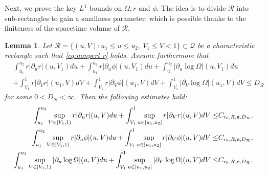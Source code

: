 \documentclass[10pt, reqno]{amsart}
\newtheorem{lemma}[theorem]{Lemma}
\theoremstyle{definition}
\theoremstyle{remark}
\numberwithin{equation}{section}
\newcommand{\abs}[1]{\vert#1\vert}
\newcommand{\set}[1]{\{#1\}}
\newcommand{\rd}{\partial}
\newcommand{\0}{\emptyset}
\newcommand{\Omg}{\Omega}
\newcommand{\bfe}{{\bf e}}
\newcommand{\calQ}{\mathcal Q}
\newcommand{\calR}{\mathcal R}
\begin{document}
Next, we prove the key $L^{1}$ bounds on $\Omg, r$ and $\phi$. The idea is to divide $\calR$ into sub-rectangles to gain a smallness parameter, which is possible thanks to the finiteness of the spacetime volume of $\calR$.

\begin{lemma} \label{lem.nonpert-L1}
Let $\calR = \set{(u, V) : u_{1} \leq u \leq u_{2}, \ V_{1} \leq V < 1} \subset \calQ$ be a characteristic rectangle such that \eqref{eq:nonpert-r} holds. Assume furthermore that 
\begin{equation} \label{eq:nonpert-L1-ini}
\begin{aligned}
	& \int_{u_{1}}^{u_{2}} r \abs{\rd_{u} r}(u, V_{1}) d u
	+ \int_{u_{1}}^{u_{2}} r \abs{\rd_{u} \phi}(u, V_{1}) d u
	+ \int_{u_{1}}^{u_{2}} \abs{\rd_{u} \log \Omg}(u, V_{1}) d u \\
	& + \int_{V_{1}}^{1} r \abs{\rd_{V} r}(u_{1}, V) d V
	+ \int_{V_{1}}^{1} r \abs{\rd_{V} \phi}(u_{1}, V) d V	
	+ \int_{V_{1}}^{1} \abs{\rd_{V} \log \Omg}(u_{1}, V) d V \leq D_{\calR} 
\end{aligned}
\end{equation}
for some $0 < D_{\calR} < \infty$. Then the following estimates hold:
\begin{align}
	\int_{u_{1}}^{u_{2}} \sup_{V \in [V_{1}, 1)} r \abs{\rd_{u} r}(u, V) d u
	+ \int_{V_{1}}^{1} \sup_{u \in [u_{1}, u_{2}]} r \abs{\rd_{V} r}(u, V) d V 
	\leq & C_{r_{0}, R, \bfe, D_{\calR}}, 			\label{eq:nonpert-L1-r} \\
	\int_{u_{1}}^{u_{2}} \sup_{V \in [V_{1}, 1)} r \abs{\rd_{u} \phi}(u, V) d u
	+ \int_{V_{1}}^{1} \sup_{u \in [u_{1}, u_{2}]} r \abs{\rd_{V} \phi}(u, V) d V 
	\leq & C_{r_{0}, R, \bfe, D_{\calR}}, 			\label{eq:nonpert-L1-phi} \\
	\int_{u_{1}}^{u_{2}} \sup_{V \in [V_{1}, 1)} \abs{\rd_{u} \log \Omg}(u, V) d u
	+ \int_{V_{1}}^{1} \sup_{u \in [u_{1}, u_{2}]} \abs{\rd_{V} \log \Omg}(u, V) d V 
	\leq & C_{r_{0}, R, \bfe, D_{\calR}}.			\label{eq:nonpert-L1-omg}
\end{align}
\end{lemma}
\end{document}
